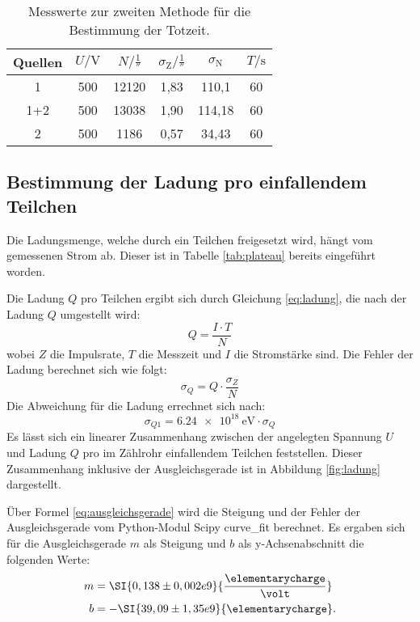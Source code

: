 \begin{table}[htpb]
	\centering
	\caption{Messwerte zur zweiten Methode für die Bestimmung der Totzeit.}
	\label{tab:zweitemethode}
	\begin{tabular}{c c c c c c}
		\toprule
		Quellen & $U / \si{\volt}$ & $N / \si{\frac{1}{\second}}$ & $\sigma_\text{Z} / \si{\frac{1}{\second}}$ & $\sigma_\text{N}$ & $T / \si{\second}$ \\
		\midrule
		1& 500 & 12120 & 1,83 & 110,1 & 60 \\
		1+2 & 500 & 13038 & 1,90 & 114,18 & 60 \\
		2 & 500 & 1186 & 0,57 & 34,43 & 60 \\
		\bottomrule
	\end{tabular}
\end{table}

\subsection{Bestimmung der Ladung pro einfallendem Teilchen}
Die Ladungsmenge, welche durch ein Teilchen freigesetzt wird, hängt vom gemessenen Strom ab. Dieser ist in Tabelle \ref{tab:plateau} bereits eingeführt worden. 

Die Ladung $Q$ pro Teilchen ergibt sich durch Gleichung \ref{eq:ladung}, die nach der Ladung $Q$ umgestellt wird:
\begin{equation}
Q = \frac{I \cdot T}{N}
\end{equation}
wobei $Z$ die Impulsrate, $T$ die Messzeit und $I$ die Stromstärke sind. Die Fehler der Ladung berechnet sich wie folgt:
\begin{equation}
\label{eq:fehlerladung}
\sigma_{Q} = Q \cdot \frac{\sigma_Z}{N}
\end{equation}
Die Abweichung für die Ladung errechnet sich nach:
\begin{equation}
\sigma_{Q1} = \SI{6,24 e18}{\electronvolt}\cdot \sigma_{Q}
\end{equation}
Es lässt sich ein linearer Zusammenhang zwischen der angelegten Spannung $U$ und Ladung $Q$ pro im Zählrohr einfallendem Teilchen feststellen. Dieser Zusammenhang inklusive der Ausgleichsgerade ist in Abbildung \ref{fig:ladung} dargestellt. 

Über Formel \ref{eq:ausgleichsgerade} wird die Steigung und der Fehler der Ausgleichsgerade vom Python-Modul Scipy curve\_fit berechnet.
Es ergaben sich für die Ausgleichsgerade $m$ als Steigung und $b$ als y-Achsenabschnitt die folgenden Werte:
\begin{align*}
m &= \SI{0,138 \pm 0,002 e9}{\frac{\elementarycharge}{\volt}} \\
b &= -\SI{39,09 \pm 1,35 e9}{\elementarycharge}.
\end{align*}

